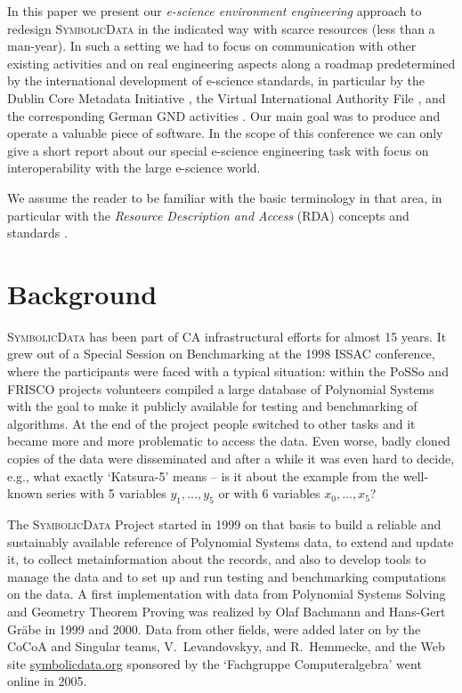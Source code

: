 \documentclass{svmult}
\newcommand{\SD}{\textsc{Symbolic\-Data}}
\begin{document}
In this paper we present our \emph{e-science environment engineering} approach
to redesign {\SD} in the indicated way with scarce resources (less than a
man-year).  In such a setting we had to focus on communication with other
existing activities and on real engineering aspects along a roadmap
predetermined by the international development of e-science standards, in
particular by the Dublin Core Metadata Initiative \cite{dc}, the Virtual
International Authority File \cite{VIAF}, and the corresponding German GND
activities \cite{GND}.  Our main goal was to produce and operate a valuable
piece of software. In the scope of this conference we can only give a short
report about our special e-science engineering task with focus on
interoperability with the large e-science world.

We assume the reader to be familiar with the basic terminology in that area,
in particular with the \emph{Resource Description and Access} (RDA) concepts
and standards \cite{RDA}.

\section{Background}

{\SD} has been part of CA infrastructural efforts for almost 15 years.  It
grew out of a Special Session on Benchmarking at the 1998 ISSAC conference,
where the participants were faced with a typical situation: within the PoSSo
and FRISCO projects volunteers compiled a large database of Polynomial Systems
with the goal to make it publicly available for testing and benchmarking of
algorithms.  At the end of the project people switched to other tasks and it
became more and more problematic to access the data.  Even worse, badly cloned
copies of the data were disseminated and after a while it was even hard to
decide, e.g., what exactly `Katsura-5' means -- is it about the example from
the well-known series with 5 variables $y_1,\dots,y_5$ or with 6 variables
$x_0,\dots,x_5$?

The {\SD} Project started in 1999 on that basis to build a reliable and
sustainably available reference of Polynomial Systems data, to extend and
update it, to collect metainformation about the records, and also to develop
tools to manage the data and to set up and run testing and benchmarking
computations on the data.  A first implementation with data from Polynomial
Systems Solving and Geometry Theorem Proving was realized by Olaf Bachmann and
Hans-Gert Gr\"abe in 1999 and 2000.  Data from other fields, were added later
on by the CoCoA and Singular teams, V.~Levandovskyy, and R.~Hemmecke, and the
Web site \url{symbolicdata.org} sponsored by the `Fachgruppe Computeralgebra'
went online in 2005.  
\end{document}
